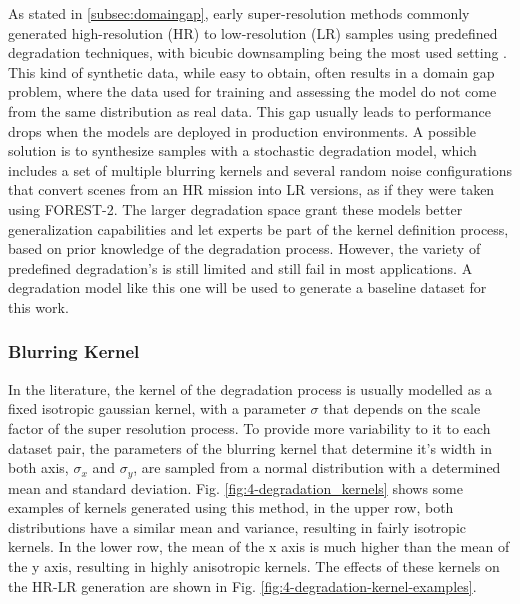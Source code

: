         As stated in \ref{subsec:domaingap}, early super-resolution methods commonly generated high-resolution (HR) to low-resolution (LR) samples using predefined degradation techniques, with bicubic downsampling being the most used setting \cite{zhang2018residual}.
        This kind of synthetic data, while easy to obtain, often results in a domain gap problem, where the data used for training and assessing the model do not come from the same distribution as real data.
        This gap usually leads to performance drops when the models are deployed in production environments.
        A possible solution is to synthesize samples with a stochastic degradation model, which includes a set of multiple blurring kernels and several random noise configurations that convert scenes from an HR mission into LR versions, as if they were taken using FOREST-2.
        The larger degradation space grant these models better generalization capabilities and let experts be part of the kernel definition process, based on prior knowledge of the degradation process.
        However, the variety of predefined degradation's is still limited and still fail in most applications. A degradation model like this one will be used to generate a baseline dataset for this work.
        

        \subsubsection{Blurring Kernel}

        In the literature, the kernel of the degradation process is usually modelled as a fixed isotropic gaussian kernel, with a parameter $\sigma$ that depends on the scale factor of the super resolution process.
        To provide more variability to it to each dataset pair, the parameters of the blurring kernel that determine it's width in both axis, $\sigma_x$ and $\sigma_y$, are sampled from a normal distribution with a determined mean and standard deviation. Fig. \ref{fig:4-degradation_kernels} shows some examples of kernels generated using this method, in the upper row, both distributions have a similar mean and variance, resulting in fairly isotropic kernels. In the lower row, the mean of the x axis is much higher than the mean of the y axis, resulting in highly anisotropic kernels. The effects of these kernels on the HR-LR generation are shown in Fig. \ref{fig:4-degradation-kernel-examples}.



